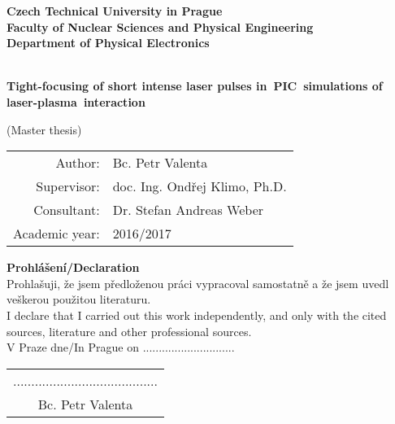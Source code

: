 \documentclass[12pt, twoside, a4paper, openright]{report}
\newcommand{\ctu}{Czech Technical University in Prague }
\newcommand{\fnspe}{Faculty of Nuclear Sciences and Physical Engineering }
\newcommand{\dpe}{Department of Physical Electronics }
\newcommand{\projecttitle}{Tight-focusing of short intense laser pulses in~PIC~simulations of laser-plasma~interaction }
\newcommand{\valenta}{Bc. Petr Valenta }
\newcommand{\klimo}{doc. Ing. Ondřej Klimo, Ph.D. }
\newcommand{\weber}{Dr. Stefan Andreas Weber }
\newcommand{\academicyear}{2016/2017 }
\begin{document}
\pagestyle{empty}



\begin{titlepage}

\begin{center}
{\Large \bf \ctu}\\[4mm]
{\Large \bf \fnspe}\\[4mm]
{\Large \bf \dpe}\\[16mm]
\epsfysize=45mm \\[12mm]
\begin{spacing}{2.0}
{\LARGE \bf \projecttitle}\\[2mm]
\end{spacing}
{\Large (Master thesis)} \\
\vfill
\end{center}

\begin{flushleft}
\begin{tabular}{rl}
Author: & \valenta \\[1mm]
Supervisor: & \klimo \\[1mm]
Consultant: & \weber \\[1mm]
Academic year: & \academicyear \\[1mm]
\end{tabular}
\end{flushleft}

\end{titlepage}


\newpage
\mbox{}


\newpage



\newpage



\newpage
\null
\vfill
{\bf \noindent Prohlášení/Declaration} \\[5mm]
Prohlašuji, že jsem předloženou práci vypracoval samostatně a že jsem uvedl veškerou
použitou literaturu.\\[2mm]
I declare that I carried out this work independently, and only with the cited sources, literature and other professional sources.\\
\vspace{5mm}V Praze dne/In Prague on .............................\hfill
\begin{tabular}{c}
........................................\\
\valenta
\end{tabular}
\end{document}

